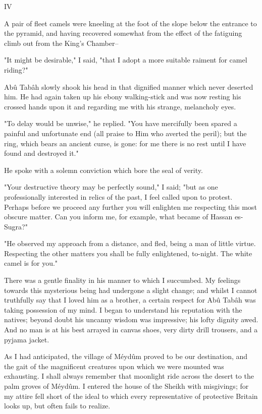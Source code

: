 IV

A pair of fleet camels were kneeling at the foot of the slope below
the entrance to the pyramid, and having recovered somewhat from the
effect of the fatiguing climb out from the King's Chamber--

"It might be desirable," I said, "that I adopt a more suitable raiment
for camel riding?"

Abû Tabâh slowly shook his head in that dignified manner which never
deserted him. He had again taken up his ebony walking-stick and was
now resting his crossed hands upon it and regarding me with his
strange, melancholy eyes.

"To delay would be unwise," he replied. "You have mercifully been
spared a painful and unfortunate end (all praise to Him who averted
the peril); but the ring, which bears an ancient curse, is gone: for
me there is no rest until I have found and destroyed it."

He spoke with a solemn conviction which bore the seal of verity.

"Your destructive theory may be perfectly sound," I said; "but as one
professionally interested in relics of the past, I feel called upon to
protest. Perhaps before we proceed any further you will enlighten me
respecting this most obscure matter. Can you inform me, for example,
what became of Hassan es-Sugra?"

"He observed my approach from a distance, and fled, being a man of
little virtue. Respecting the other matters you shall be fully
enlightened, to-night. The white camel is for you."

There was a gentle finality in his manner to which I succumbed. My
feelings towards this mysterious being had undergone a slight change;
and whilst I cannot truthfully say that I loved him as a brother,
a certain respect for Abû Tabâh was taking possession of my mind. I
began to understand his reputation with the natives; beyond doubt his
uncanny wisdom was impressive; his lofty dignity awed. And no man is
at his best arrayed in canvas shoes, very dirty drill trousers, and
a pyjama jacket.

As I had anticipated, the village of Méydûm proved to be our
destination, and the gait of the magnificent creatures upon which we
were mounted was exhausting. I shall always remember that moonlight
ride across the desert to the palm groves of Méydûm. I entered the
house of the Sheikh with misgivings; for my attire fell short of the
ideal to which every representative of protective Britain looks up,
but often fails to realize.


